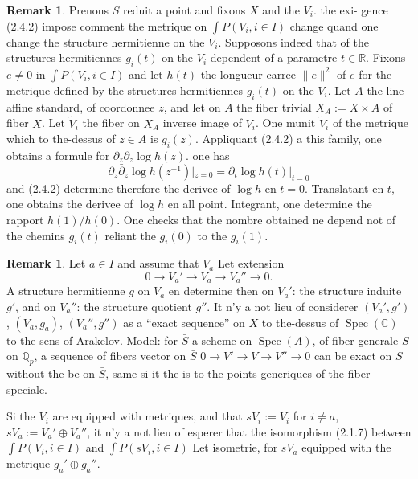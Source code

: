 \documentclass[12pt,a4paper]{article}
\theoremstyle{plain}
\theoremstyle{definition}
\newtheorem{remark}[theorem]{Remark}
\DeclareMathOperator{\Spec}{Spec}
\newcommand{\QQ}{\mathbb{Q}}
\newcommand{\RR}{\mathbb{R}}
\newcommand{\CC}{\mathbb{C}}
\begin{document}
\begin{remark}
Prenons $S$ reduit a point and fixons $X$ and the $V_i$. the exi-
gence (2.4.2) impose comment the metrique on $\int P(V_i, i \in I)$ change quand one
change the structure hermitienne on the $V_i$. Supposons indeed that of the structures
hermitiennes $g_i(t)$ on the $V_i$ dependent of a parametre $t \in \RR$. Fixons $e \neq
0$ in $\int P(V_i, i \in I)$ and let $h(t)$ the longueur carree $\|e\|^2$ of $e$ for
the metrique defined by the structures hermitiennes $g_i(t)$ on the $V_i$. Let
$A$ the line affine standard, of coordonnee $z$, and let on $A$ the fiber trivial
$X_A := X \times A$ of fiber $X$. Let $\tilde{V}_i$ the fiber on $X_A$ inverse image of $V_i$.
One munit $\tilde{V}_i$ of the metrique which to the-dessus of $z \in A$ is $g_i(z)$. Appliquant
(2.4.2) a this family, one obtains a formule for $\partial_z \bar\partial_z \log h(z)$. one has
\[
\partial_z \bar\partial_z \log h(z^{-1})|_{z=0} = \partial_t \log h(t)|_{t=0}
\]
and (2.4.2) determine therefore the derivee of $\log h$ en $t=0$. Translatant en $t$,
one obtains the derivee of $\log h$ en all point. Integrant, one determine the rapport
$h(1)/h(0)$. One checks that the nombre obtained ne depend not of the chemins $g_i(t)$
reliant the $g_i(0)$ to the $g_i(1)$.
\end{remark}

\begin{remark}
Let $a \in I$ and assume that $V_a$ Let extension
\[
0 \to V_a' \to V_a \to V_a'' \to 0 .
\]
A structure hermitienne $g$ on $V_a$ en determine then on $V_a'$: the structure
induite $g'$, and on $V_a''$: the structure quotient $g''$. It n'y a not lieu of
considerer $(V_a', g')$, $(V_a, g_a)$, $(V_a'', g'')$ as a ``exact sequence'' on $X$
to the-dessus of $\Spec(\CC)$ to the sens of Arakelov. Model: for $\bar{S}$ a scheme on
$\Spec(A)$, of fiber generale $S$ on $\QQ_p$, a sequence of fibers vector on
$\bar{S}$ $0 \to V' \to V \to V'' \to 0$ can be exact on $S$ without the be on $\bar{S}$, same si
it the is to the points generiques of the fiber speciale.

Si the $V_i$ are equipped with metriques, and that $sV_i := V_i$ for $i \neq a$, $sV_a :=
V_a' \oplus V_a''$, it n'y a not lieu of esperer that the isomorphism (2.1.7) between $\int P(V_i,
i \in I)$ and $\int P(sV_i, i \in I)$ Let isometrie, for $sV_a$ equipped with the metrique
$g_a' \oplus g_a''$.
\end{remark}

\subsection{}
\end{document}
